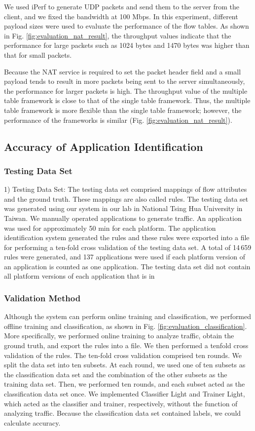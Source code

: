 \documentclass[10pt,journal]{IEEEtran}
\begin{document}
We used iPerf to generate UDP packets and send them to the server from the client, and we fixed the bandwidth at 100 Mbps. In this experiment, different payload sizes were used to evaluate the performance of the flow tables. As shown in Fig. \ref{fig:evaluation_nat_result}, the throughput values indicate that the performance for large packets such as 1024 bytes and 1470 bytes was higher than that for small packets.

Because the NAT service is required to set the packet header field and a small payload tends to result in more packets being sent to the server simultaneously, the performance for larger packets is high. The throughput value of the multiple table framework is close to that of the single table framework. Thus, the multiple table framework is more flexible than the single table framework; however, the performance of the frameworks is similar (Fig. \ref{fig:evaluation_nat_result}).



\subsection{Accuracy of Application Identification}
\subsubsection{Testing Data Set}
1)	Testing Data Set: The testing data set comprised mappings of flow attributes and the ground truth. These mappings are also called rules. The testing data set was generated using our system in our lab in National Tsing Hua University in Taiwan. We manually operated applications to generate traffic. An application was used for approximately 50 min for each platform. The application identification system generated the rules and these rules were exported into a file for performing a ten-fold cross validation of the testing data set. A total of 14 659 rules were generated, and 137 applications were used if each platform version of an application is counted as one application. The testing data set did not contain all platform versions of each application that is in

\subsubsection{Validation Method}
Although the system can perform online training and classification, we performed offline training and classification, as shown in Fig. \ref{fig:evaluation_classification}. More specifically, we performed online training to analyze traffic, obtain the ground truth, and export the rules into a file. We then performed a tenfold cross validation of the rules. The ten-fold cross validation comprised ten rounds. We split the data set into ten subsets. At each round, we used one of ten subsets as the classification data set and the combination of the other subsets as the training data set. Then, we performed ten rounds, and each subset acted as the classification data set once. We implemented Classifier Light and Trainer Light, which acted as the classifier and trainer, respectively, without the function of analyzing traffic. Because the classification data set contained labels, we could calculate accuracy.
\end{document}
